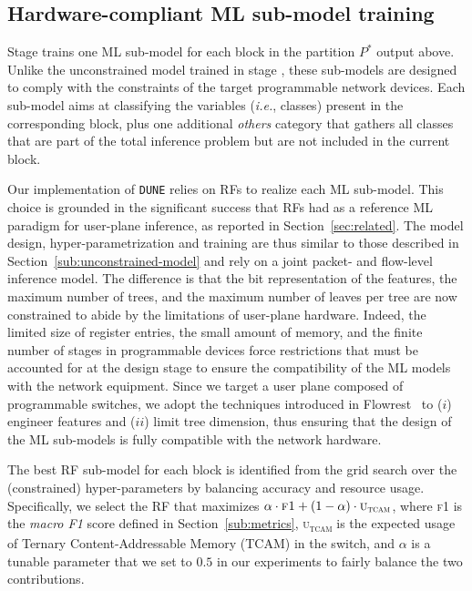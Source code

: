 \documentclass[journal]{IEEEtran}
\theoremstyle{plain} %
\newcommand{\ie}{\textit{i.e.},\xspace}
\newcommand*\numO[1]{\raisebox{.5pt}{\textcircled{\raisebox{-.9pt} {#1}}}}
\newcommand{\name}{\texttt{\fontsize{9}{11}\selectfont DUNE}\xspace}
\begin{document}
\subsection{Hardware-compliant ML sub-model training}
\label{sub:sub-models}

Stage \numO{4} trains one ML sub-model for each block in the partition $P^*$ output above. Unlike the unconstrained model trained in stage \numO{1}, these sub-models are designed to comply with the constraints of the target programmable network devices. Each sub-model aims at classifying the variables (\ie classes) present in the corresponding block, plus one additional \textit{others} category that gathers all classes that are part of the total inference problem but are not included in the current block.

Our implementation of \name relies on RFs to realize each ML sub-model. This choice is grounded in the significant success that RFs had as a reference ML paradigm for user-plane inference, as reported in Section~\ref{sec:related}.
The model design, hyper-parametrization and training are thus similar to those described in Section~\ref{sub:unconstrained-model} and rely on a joint packet- and flow-level inference model. The difference is that the bit representation of the features, the maximum number of trees, and the maximum number of leaves per tree are now constrained to abide by the limitations of user-plane hardware. Indeed, the limited size of register entries, the small amount of memory, and the finite number of stages in programmable devices force restrictions that must be accounted for at the design stage to ensure the compatibility of the ML models with the network equipment. Since we target a user plane composed of programmable switches, we adopt the techniques introduced in Flowrest~\cite{flowrest} to ($i$) engineer features and ($ii$) limit tree dimension, thus ensuring that the design of the ML sub-models is fully compatible with the network hardware.

The best RF sub-model for each block is identified from the grid search over the (constrained) hyper-parameters by balancing accuracy and resource usage. Specifically, we select the RF that maximizes
$\alpha\cdot \text{\sc{f1}} +(1-\alpha)\cdot \text{\sc{u\textsubscript{tcam}}}$, where \textsc{f1} is the \textit{macro F1} score defined in Section~\ref{sub:metrics}, \textsc{u\textsubscript{tcam}} is the expected usage of Ternary Content-Addressable Memory (TCAM) in the switch, and $\alpha$ is a tunable parameter that we set to $0.5$ in our experiments to fairly balance the two contributions.
\end{document}
